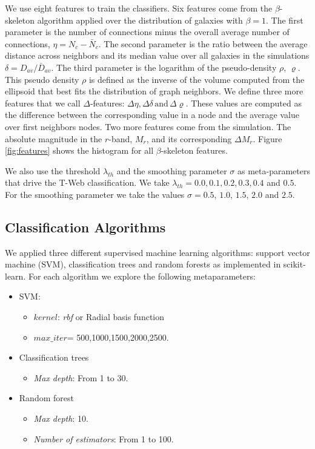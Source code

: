 \documentclass[usenatbib]{mnras}
\begin{document}
We use eight features to train the classifiers.
Six features come from the $\beta$-skeleton algorithm applied over the distribution
of galaxies with $\beta=1$.
The first parameter is the number of connections minus the overall average number of
connections, $\eta = N_c - \bar{N}_c$. 
The second parameter is the ratio between the average distance across neighbors and its median
value over all galaxies in the simulations $\delta=D_{av}/\bar{D}_{av}$.
The third parameter is the logarithm of the pseudo-density $\rho$, $\varrho$. 
This pseudo density $\rho$ is defined as the inverse of the volume computed from the ellipsoid that best fits the distribution of graph neighbors.
We define three more features that we call $\Delta$-features: $\Delta\eta,\Delta\delta\,\text{and}\,\Delta\varrho$. 
These values are computed as the difference between the corresponding value in a node and the 
average value over first neighbors nodes.
Two more features come from the simulation. The absolute magnitude in the 
$r$-band, $M_r$, and its corresponding $\Delta M_r$.
Figure \ref{fig:features} shows the histogram for all $\beta$-skeleton features.



We also use the threshold $\lambda_{th}$ and the smoothing parameter $\sigma$ as
meta-parameters that drive the T-Web classification. 
We take $\lambda_{th}=0.0, 0.1, 0.2, 0.3, 0.4$ and $0.5$.
For the smoothing parameter we take the values $\sigma=0.5$, $1.0$, $1.5$, $2.0$ and $2.5$. 

\subsection{Classification Algorithms}

We applied three different supervised machine learning algorithms: support vector machine (SVM),
classification trees and random forests as implemented in scikit-learn. 
 For each algorithm we explore the following metaparameters:
\begin{itemize}
    \item SVM: 
        \begin{itemize}
            \item $kernel$: \textit{rbf} or Radial basis function
            \item $max\_iter$= 500,1000,1500,2000,2500.
        \end{itemize}
    \item Classification trees
        \begin{itemize}
            \item \textit{Max depth}: From 1 to 30.
        \end{itemize}
    \item Random forest
        \begin{itemize}
            \item \textit{Max depth}: 10.
            \item \textit{Number of estimators}: From 1 to 100.
        \end{itemize}
\end{itemize}
\end{document}
